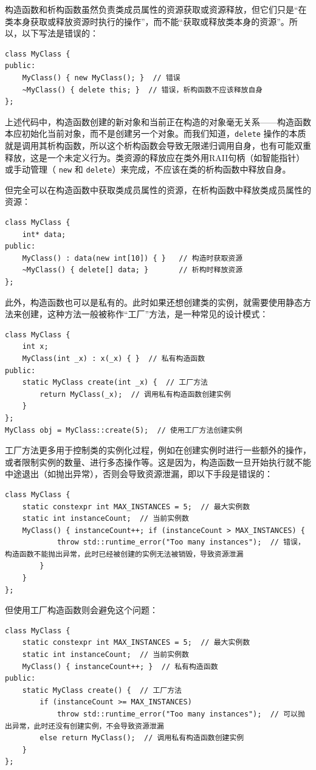 构造函数和析构函数虽然负责类成员属性的资源获取或资源释放，但它们只是“在类本身获取或释放资源时执行的操作”，而不能“获取或释放类本身的资源”。所以，以下写法是错误的：
\begin{verbatim}
class MyClass {
public:
    MyClass() { new MyClass(); }  // 错误
    ~MyClass() { delete this; }  // 错误，析构函数不应该释放自身
};
\end{verbatim} 
上述代码中，构造函数创建的新对象和当前正在构造的对象毫无关系——构造函数本应初始化当前对象，而不是创建另一个对象。而我们知道，\verb|delete| 操作的本质就是调用其析构函数，所以这个析构函数会导致无限递归调用自身，也有可能双重释放，这是一个未定义行为。类资源的释放应在类外用RAII句柄（如智能指针）或手动管理（ \verb|new| 和 \verb|delete|）来完成，不应该在类的析构函数中释放自身。

但完全可以在构造函数中获取类成员属性的资源，在析构函数中释放类成员属性的资源：
\begin{verbatim}
class MyClass {
    int* data; 
public:
    MyClass() : data(new int[10]) { }   // 构造时获取资源
    ~MyClass() { delete[] data; }       // 析构时释放资源
};
\end{verbatim}

此外，构造函数也可以是私有的。此时如果还想创建类的实例，就需要使用静态方法来创建，这种方法一般被称作“工厂”方法，是一种常见的设计模式：
\begin{verbatim}
class MyClass {
    int x;
    MyClass(int _x) : x(_x) { }  // 私有构造函数
public:
    static MyClass create(int _x) {  // 工厂方法
        return MyClass(_x);  // 调用私有构造函数创建实例
    }
};
MyClass obj = MyClass::create(5);  // 使用工厂方法创建实例
\end{verbatim}
工厂方法更多用于控制类的实例化过程，例如在创建实例时进行一些额外的操作，或者限制实例的数量、进行多态操作等。这是因为，构造函数一旦开始执行就不能中途退出（如抛出异常），否则会导致资源泄漏，即以下手段是错误的：
\begin{verbatim}
class MyClass {
    static constexpr int MAX_INSTANCES = 5;  // 最大实例数
    static int instanceCount;  // 当前实例数
    MyClass() { instanceCount++; if (instanceCount > MAX_INSTANCES) {
            throw std::runtime_error("Too many instances");  // 错误，构造函数不能抛出异常，此时已经被创建的实例无法被销毁，导致资源泄漏
        }
    }
};
\end{verbatim}
但使用工厂构造函数则会避免这个问题：
\begin{verbatim}
class MyClass {
    static constexpr int MAX_INSTANCES = 5;  // 最大实例数
    static int instanceCount;  // 当前实例数
    MyClass() { instanceCount++; }  // 私有构造函数
public:
    static MyClass create() {  // 工厂方法
        if (instanceCount >= MAX_INSTANCES) 
            throw std::runtime_error("Too many instances");  // 可以抛出异常，此时还没有创建实例，不会导致资源泄漏
        else return MyClass();  // 调用私有构造函数创建实例
    }
};
\end{verbatim}
